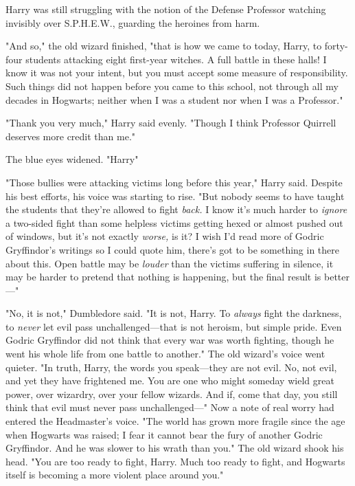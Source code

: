 Harry was still struggling with the notion of the Defense Professor watching
invisibly over S.P.H.E.W., guarding the heroines from harm.

"And so," the old wizard finished, "that is how we came to today, Harry, to
forty-four students attacking eight first-year witches. A full battle in these
halls! I know it was not your intent, but you must accept some measure of
responsibility. Such things did not happen before you came to this school, not
through all my decades in Hogwarts; neither when I was a student nor when I was
a Professor."

"Thank you very much," Harry said evenly. "Though I think Professor Quirrell
deserves more credit than me."

The blue eyes widened. "Harry{\el}"

"Those bullies were attacking victims long before this year," Harry said.
Despite his best efforts, his voice was starting to rise. "But nobody seems to
have taught the students that they're allowed to fight \emph{back.} I know it's
much harder to \emph{ignore} a two-sided fight than some helpless victims
getting hexed or almost pushed out of windows, but it's not exactly
\emph{worse,} is it? I wish I'd read more of Godric Gryffindor's writings so I
could quote him, there's got to be something in there about this. Open battle
may be \emph{louder} than the victims suffering in silence, it may be harder to
pretend that nothing is happening, but the final result is better---"

"No, it is not," Dumbledore said. "It is not, Harry. To \emph{always} fight the
darkness, to \emph{never} let evil pass unchallenged---that is not heroism, but
simple pride. Even Godric Gryffindor did not think that every war was worth
fighting, though he went his whole life from one battle to another." The old
wizard's voice went quieter. "In truth, Harry, the words you speak---they are
not evil. No, not evil, and yet they have frightened me. You are one who might
someday wield great power, over wizardry, over your fellow wizards. And if,
come that day, you still think that evil must never pass unchallenged---" Now a
note of real worry had entered the Headmaster's voice. "The world has grown
more fragile since the age when Hogwarts was raised; I fear it cannot bear the
fury of another Godric Gryffindor. And he was slower to his wrath than you."
The old wizard shook his head. "You are too ready to fight, Harry. Much too
ready to fight, and Hogwarts itself is becoming a more violent place around
you."

